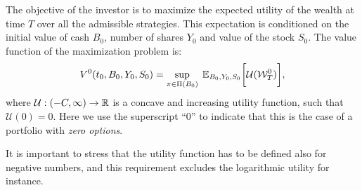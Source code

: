 The objective of the investor is to maximize the expected utility of the wealth at time $T$ over all the admissible
strategies. This expectation is conditioned on the initial value of cash $B_0$, number of shares $Y_0$ and value of the
stock $S_0$.
The value function of the maximization problem is:
\begin{equation}\label{DPZ_max_probl0}
V^0(t_0,B_0,Y_0,S_0) = \sup_{\pi \in \Pi(B_0)} \;  \mathbb{E}_{B_0,Y_0,S_0}\biggl[ 
            \mathcal{U}(\mathcal{W}^0_T) \biggr], 
\end{equation}
where $\mathcal{U}: (-C,\infty) \to \mathbb{R}$ is a concave and increasing utility function, such that $\mathcal{U}(0)=0$. 
Here we use the superscript ``$0$'' to indicate that this is the case of a portfolio with \emph{zero options}. 
\begin{Remark}
It is important to stress that the utility function
has to be defined also for negative numbers, and this requirement excludes the logarithmic utility for instance.
\end{Remark}

